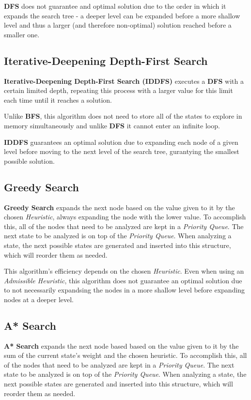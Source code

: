 \documentclass[conference]{IEEEtran}
\begin{document}
\textbf{DFS} does not guarantee and optimal solution due to the order in which it expands the search tree - a deeper level can be expanded before a more shallow level and thus a larger (and therefore non-optimal) solution reached before a smaller one.

\subsection{Iterative-Deepening Depth-First Search}

\textbf{Iterative-Deepening Depth-First Search (IDDFS)} executes a \textbf{DFS} with a certain limited depth, repeating this process with a larger value for this limit each time until it reaches a solution.

Unlike \textbf{BFS}, this algorithm does not need to store all of the states to explore in memory simultaneously and unlike \textbf{DFS} it cannot enter an infinite loop.

\textbf{IDDFS} guarantees an optimal solution due to expanding each node of a given level before moving to the next level of the search tree, gurantying the smallest possible solution.

\subsection{Greedy Search}

\textbf{Greedy Search} expands the next node based on the value given to it by the chosen \textit{Heuristic}, always expanding the node with the lower value. To accomplish this, all of the nodes that need to be analyzed are kept in a \textit{Priority Queue}. The next state to be analyzed is on top of the \textit{Priority Queue}. When analyzing a state, the next possible states are generated and inserted into this structure, which will reorder them as needed.

This algorithm's efficiency depends on the chosen \textit{Heuristic}. Even when using an \textit{Admissible Heuristic}, this algorithm does not guarantee an optimal solution due to not necessarily expandsing the nodes in a more shallow level before expanding nodes at a deeper level.

\subsection{A* Search}

\textbf{A* Search} expands the next node based based on the value given to it by the sum of the current state's weight and the chosen heuristic. To accomplish this, all of the nodes that need to be analyzed are kept in a \textit{Priority Queue}. The next state to be analyzed is on top of the \textit{Priority Queue}. When analyzing a state, the next possible states are generated and inserted into this structure, which will reorder them as needed.
\end{document}
